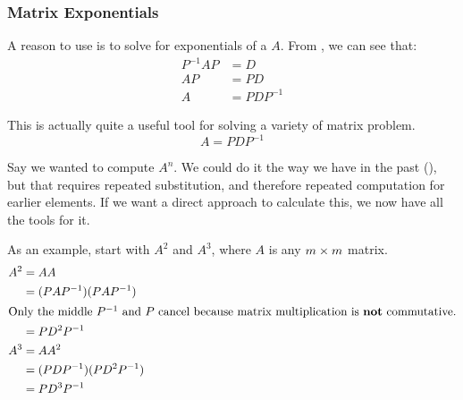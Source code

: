 \subsubsection{Matrix Exponentials}\label{subsubsec:Matrix_Exponentials}
A reason to use  is to solve for exponentials of a  $A$.
From , we can see that:
\begin{align*}
  P^{-1} A P &= D \\
  AP &= PD \\
  A &= P D P^{-1}
\end{align*}

This is actually quite a useful tool for solving a variety of matrix problem.
\begin{equation}\label{eq:Diagonalizable_A}
  A = P D P^{-1}
\end{equation}

Say we wanted to compute $A^{n}$.
We could do it the way we have in the past (), but that requires repeated substitution, and therefore repeated computation for earlier elements.
If we want a direct approach to calculate this, we now have all the tools for it.

\begin{blackbox}
  As an example, start with $A^{2}$ and $A^{3}$, where $A$ is any $m \times m$ matrix.
  \begin{align*}
    A^{2} &= A A \\
          &= (P A P^{-1}) (P A P^{-1}) \\
    \intertext{Only the middle $P^{-1}$ and $P$ cancel because matrix multiplication is \textbf{not} commutative.}
          &= P D^{2} P^{-1} \\
    A^{3} &= A A^{2} \\
          &= (P D P^{-1}) (P D^{2} P^{-1}) \\
          &= P D^{3} P^{-1}
  \end{align*}
\end{blackbox}


